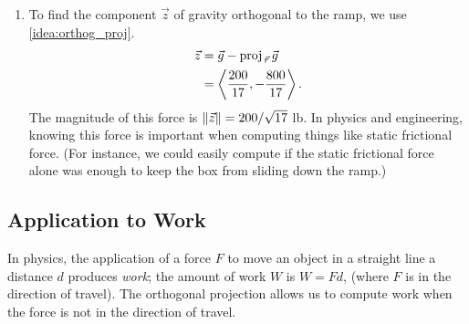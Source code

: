 \begin{example}
\begin{enumerate}
	\begin{align*}
	\proj gr &= \frac{\vec g\cdot\vec r}{\vec r\cdot\vec r}\vec r\\
	&=  \frac{-250}{425}\bracket{20,5}\\
	&=\bracket{-\frac{200}{17},-\frac{50}{17}}%
	.
	\end{align*}
	The magnitude of $\proj gr$ is $\norm{\proj gr} = 50/\sqrt{17} \approx 12.13\text{ lb}$. Though the box weighs 50 lb, a force of about 12 lb is enough to keep the box from sliding down the ramp.
	
	\item		To find the component $\vec z$ of gravity orthogonal to the ramp, we use \autoref{idea:orthog_proj}.\vspace{-.5\baselineskip}
	\begin{align*}
	\vec z &= \vec g - \proj gr \\
	&=\bracket{\frac{200}{17},-\frac{800}{17}}%
	.
	\end{align*}
	The magnitude of this force is $\norm{\vec z}=200/\sqrt{17}%
	$ lb. In physics and engineering, knowing this force is important when computing things like static frictional force. (For instance, we could easily compute if the static frictional force alone was enough to keep the box from sliding down the ramp.)
\end{enumerate}
\end{example}

\subsection{Application to Work}

In physics, the application of a force $F$ to move an object in a straight line a distance $d$ produces \emph{work}; the amount of work $W$ is $W=Fd$, (where $F$ is in the direction of travel). The orthogonal projection allows us to compute work when the force is not in the direction of travel.


